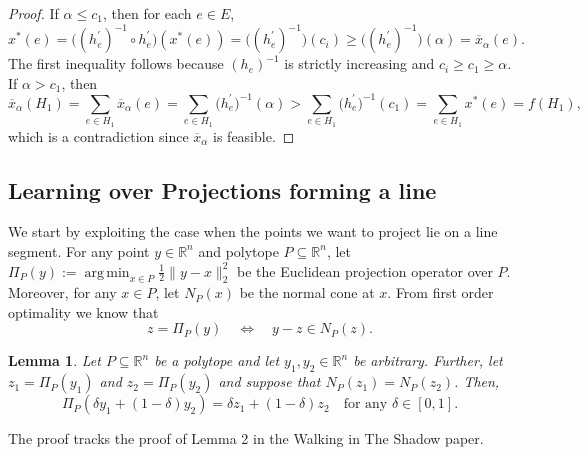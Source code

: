 \documentclass{article}
\newtheorem{lemma}{Lemma}
\DeclareMathOperator*{\argmin}{arg\,min}
\begin{document}
\begin{proof}
    If $\alpha \le c_1$, then for each $e \in E$, 
    \[
        x^*(e) = \big((h_e^\prime)^{-1} \circ h_e^\prime \big)(x^*(e)) = \big((h_e^\prime)^{-1}\big)(c_i) \ge \big((h_e^\prime)^{-1}\big)(\alpha) = \overline{x}_\alpha(e).
    \]
    The first inequality follows because $(h_e)^{-1}$ is strictly increasing and $c_i \ge c_1 \ge \alpha$. If $\alpha > c_1$, then 
    \[
        \overline{x}_\alpha(H_1) = \sum_{e \in H_1} \overline{x}_\alpha(e) = \sum_{e \in H_1} \big(h_e^\prime\big)^{-1}(\alpha) > \sum_{e \in H_1} \big(h_e^\prime\big)^{-1}(c_1) = \sum_{e \in H_1} x^*(e) = f(H_1),
    \]
    which is a contradiction since $\overline{x}_\alpha$ is feasible.
\end{proof}

\newpage

\subsection*{Learning over Projections forming a line}
We start by exploiting the case when the points we want to project lie on a line segment. For any point $y \in \mathbb{R}^n$ and polytope $P \subseteq \mathbb{R}^n$, let $\Pi_P(y) := \argmin_{x \in P} \frac{1}{2}\| y - x\|_2^2$ be the Euclidean projection operator over $P$. Moreover, for any $x \in P$, let $N_P(x)$ be the normal cone at $x$. From first order optimality we know that
$$z = \Pi_P(y) \quad \Leftrightarrow \quad y - z \in N_P(z).$$


\begin{lemma}
Let $P \subseteq \mathbb{R}^n$ be a polytope and let $y_1,y_2 \in \mathbb{R}^n$ be arbitrary. Further, let $z_1 =\Pi_P(y_1)$ and $z_2 =\Pi_P(y_2)$ and suppose that $N_P(z_1) = N_P(z_2)$. Then,
$$ \Pi_P( \delta y_1 + (1 - \delta) y_2) = \delta z_1 + (1 - \delta) z_2 \quad \text{for any $\delta \in [0,1]$}.$$
\end{lemma}

The proof tracks the proof of Lemma 2 in the Walking in The Shadow paper.
\end{document}
